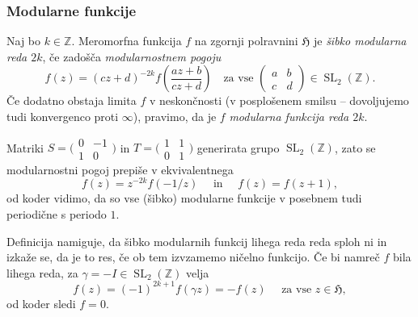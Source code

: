 \documentclass[mat1]{fmfdelo}
\numberwithin{equation}{section}
\newcommand{\Z}{\mathbb Z}
\newcommand{\HH}{\mathfrak{H}}
\newcommand{\SL}{\operatorname{SL}_2(\Z)}
\newcommand{\pabcd}{\begin{pmatrix} a & b \\ c & d \end{pmatrix}}
\newcommand{\ti}{t.~i.\ }
\theoremstyle{definition}
\begin{document}
\subsubsection{Modularne funkcije}

\begin{definicija}
    Naj bo $k \in \Z$. Meromorfna funkcija $f$ na zgornji polravnini $\HH$ je \emph{šibko modularna reda $2k$}, če zadošča \emph{modularnostnem pogoju}
    \begin{equation}
        \label{eq: modularnostni pogoj}
        f(z) = (cz + d)^{-2k} f\left(\frac{az + b}{cz + d}\right) \quad \text{za vse } \pabcd \in \SL.
    \end{equation}
    Če dodatno obstaja limita $f$ v neskončnosti (v posplošenem smilsu -- dovoljujemo tudi konvergenco proti $\infty$), pravimo, da je $f$ \emph{modularna funkcija reda $2k$}. 
\end{definicija}

\begin{opomba}
    Matriki $S = \big(\begin{smallmatrix} 0 & -1\\1 & 0 \end{smallmatrix}\big)$ in $T = \big(\begin{smallmatrix} 1 & 1\\0 & 1 \end{smallmatrix}\big)$ generirata grupo $\SL$, zato se modularnostni pogoj prepiše v ekvivalentnega
    \[
        f(z) = z^{-2k}f\left(-1/z\right) \quad \text{ in } \quad f(z) = f(z + 1),
    \] 
    od koder vidimo, da so vse (šibko) modularne funkcije v posebnem tudi periodične s periodo $1$.
\end{opomba}

\begin{opomba}
    Definicija namiguje, da šibko modularnih funkcij lihega reda reda sploh ni in izkaže se, da je to res, če ob tem izvzamemo ničelno funkcijo. Če bi namreč $f$ bila lihega reda, za $\gamma = -I \in \SL$ velja
    \[
        f(z) = (-1)^{2k+1}f(\gamma z) = -f(z) \quad \text{ za vse } z \in \HH,
    \]
    od koder sledi $f=0$.
\end{opomba}
\end{document}
